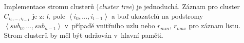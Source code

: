 Implementace stromu clusterů (\emph{cluster tree}) je jednoduchá\@.
Záznam pro cluster $C_{i_{0},\ldots,i_{l-1}}$ je z: $l$, pole $\left\langle i_{0},\ldots,i_{l-1}\right\rangle $
a buď ukazatelů na podstromy $\left\langle sub_{0},\ldots,sub_{n-1}\right\rangle $
v~případě vnitřního uzlu nebo $r_{min},\, r_{max}$ pro záznam listu\@.
Strom clusterů by měl být udržován v~hlavní paměti.

